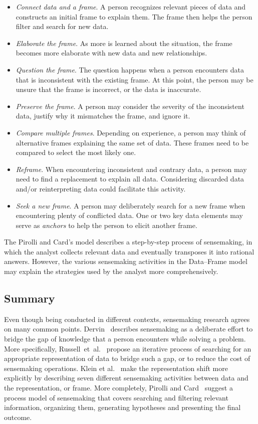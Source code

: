 \begin{itemize}
	\item \emph{Connect data and a frame}. A person recognizes relevant pieces of data and constructs an initial frame to explain them. The frame then helps the person filter and search for new data.
	\item \emph{Elaborate the frame}. As more is learned about the situation, the frame becomes more elaborate with new data and new relationships. 
	\item \emph{Question the frame}. The question happens when a person encounters data that is inconsistent with the existing frame. At this point, the person may be unsure that the frame is incorrect, or the data is inaccurate.
	\item \emph{Preserve the frame}. A person may consider the severity of the inconsistent data, justify why it mismatches the frame, and ignore it.
	\item \emph{Compare multiple frames}. Depending on experience, a person may think of alternative frames explaining the same set of data. These frames need to be compared to select the most likely one.
	\item \emph{Reframe}. When encountering inconsistent and contrary data, a person may need to find a replacement to explain all data. Considering discarded data and/or reinterpreting data could facilitate this activity.
	\item \emph{Seek a new frame}. A person may deliberately search for a new frame when encountering plenty of conflicted data. One or two key data elements may serve as \emph{anchors} to help the person to elicit another frame.
\end{itemize}

The Pirolli and Card's model describes a step-by-step process of sensemaking, in which the analyst collects relevant data and eventually transposes it into rational answers. However, the various sensemaking activities in the Data--Frame model may explain the strategies used by the analyst more comprehensively.

\subsection{Summary}
Even though being conducted in different contexts, sensemaking research agrees on many common points. Dervin~\cite{Dervin1983} describes sensemaking as a deliberate effort to bridge the gap of knowledge that a person encounters while solving a problem. More specifically, Russell~et~al.~\cite{Russell1993} propose an iterative process of searching for an appropriate representation of data to bridge such a gap, or to reduce the cost of sensemaking operations. Klein et al.~\cite{Klein2003} make the representation shift more explicitly by describing seven different sensemaking activities between data and the representation, or frame. More completely, Pirolli and Card~\cite{Pirolli2005} suggest a process model of sensemaking that covers searching and filtering relevant information, organizing them, generating hypotheses and presenting the final outcome.

